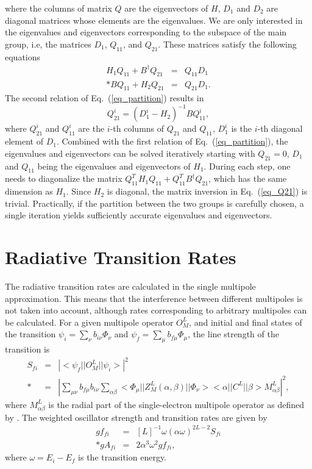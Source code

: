 where the columns of matrix $Q$ are the eigenvectors of $H$, $D_1$ and $D_2$
are diagonal matrices whose elements are the eigenvalues. We are only
interested in the eigenvalues and eigenvectors corresponding to the subspace
of the main group, i.e, the matrices $D_1$, $Q_{11}$, and $Q_{21}$. These
matrices satisfy the following equations
\begin{eqnarray}
\label{eq_partition}
H_1 Q_{11} + B^{\dagger}Q_{21} &=&  Q_{11} D_1 \nonumber \\*
B Q_{11} + H_2 Q_{21} &=& Q_{21} D_1 .
\end{eqnarray}
The second relation of Eq.~(\ref{eq_partition}) results in 
\begin{equation}
\label{eq_Q21}
Q_{21}^{i} = (D_1^{i} - H_2)^{-1}B Q_{11}^{i},
\end{equation}
where $Q_{21}^{i}$ and $Q_{11}^{i}$ are the $i$-th columns of $Q_{21}$ and
$Q_{11}$, $D_1^{i}$ is the $i$-th diagonal element of $D_1$. Combined with the
first relation of Eq.~(\ref{eq_partition}), the eigenvalues and
eigenvectors can 
be solved iteratively starting with $Q_{21} = 0$, $D_1$ and $Q_{11}$ being the
eigenvalues and eigenvectors of $H_1$. During each step, one needs to
diagonalize the matrix $Q_{11}^{T} H_1 Q_{11} + Q_{11}^{T}B^{\dagger}Q_{21}$,
which has the same dimension as $H_1$. Since $H_2$ is diagonal, the matrix
inversion in Eq.~(\ref{eq_Q21}) is trivial. Practically, if the partition
between the two groups is carefully chosen, a single iteration yields
sufficiently accurate eigenvalues and eigenvectors.

\section{Radiative Transition Rates}
The radiative transition rates are calculated in the single multipole
approximation. This means that the interference between different multipoles
is not taken into account, although rates corresponding to arbitrary
multipoles can be calculated. For a given multipole operator $O^L_M$, and
initial and final states of 
the transition $\psi_i = \sum_\nu b_{i\nu}\Phi_\nu$ and $\psi_f = \sum_\mu
b_{f\mu}\Phi_\mu$, the line strength of the transition is 
\begin{eqnarray}
S_{fi} &=& \left|<\psi_f||O^L_M||\psi_i>\right|^2 \nonumber\\*
&=& \left|\sum_{\mu\nu}b_{f\mu}b_{i\nu}\sum_{\alpha\beta}
<\Phi_\mu||Z^L_M(\alpha,\beta)||\Phi_\nu><\alpha||C^L||\beta>
M^L_{\alpha\beta}\right|^2 ,
\end{eqnarray} 
where $M^L_{\alpha\beta}$ is the radial part of the single-electron multipole
operator as defined by \citet{grant74}.
The weighted oscillator strength and transition rates are given by 
\begin{eqnarray}
gf_{fi} &=& [L]^{-1}\omega(\alpha\omega)^{2L-2} S_{fi} \\*
gA_{fi} &=& 2\alpha^3 \omega^2 gf_{fi},
\end{eqnarray}
where $\omega = E_i - E_f$ is the transition energy. 

